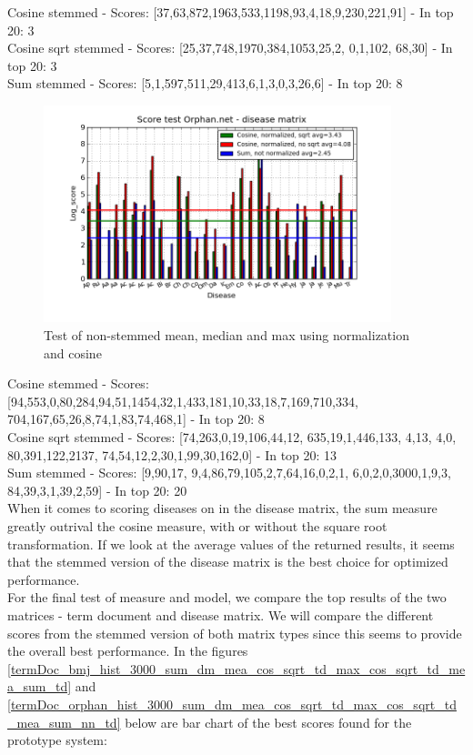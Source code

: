 {\small 
Cosine stemmed - Scores: [37,63,872,1963,533,1198,93,4,18,9,230,221,91] - In top 20: 3 \\
Cosine sqrt stemmed - Scores: [25,37,748,1970,384,1053,25,2, 0,1,102, 68,30] - In top 20: 3 \\
Sum stemmed - Scores: [5,1,597,511,29,413,6,1,3,0,3,26,6] - In top 20: 8
}
\begin{figure}[h!]
        \begin{center}
          \includegraphics[width=0.9\textwidth]{barcharts/diseaseMatrix_orphan_hist_NOTnorm_3000_s_cos_sqrt_cos_sum_nn.png}
        \end{center}
        \caption{Test of non-stemmed mean, median and max using normalization and cosine}
        \label{diseaseMatrix_orphan_hist_NOTnorm_3000_s_cos_sqrt_cos_sum_nn}
\end{figure}

{\small
Cosine stemmed - Scores: [94,553,0,80,284,94,51,1454,32,1,433,181,10,33,18,7,169,710,334, 704,167,65,26,8,74,1,83,74,468,1] - In top 20: 8 \\
Cosine sqrt stemmed - Scores: [74,263,0,19,106,44,12, 635,19,1,446,133, 4,13, 4,0, 80,391,122,2137, 74,54,12,2,30,1,99,30,162,0] - In top 20: 13 \\
Sum stemmed - Scores: [9,90,17, 9,4,86,79,105,2,7,64,16,0,2,1, 6,0,2,0,3000,1,9,3, 84,39,3,1,39,2,59] - In top 20: 20 \\
}
When it comes to scoring diseases on in the disease matrix, the sum measure greatly outrival the cosine measure, with or without the square root transformation. If we look at the average values of the returned results, it seems that the stemmed version of the disease matrix is the best choice for optimized performance. \\

For the final test of measure and model, we compare the top results of the two matrices - term document and disease matrix. We will compare the different scores from the stemmed version of both matrix types since this seems to provide the overall best performance. In the figures \ref{termDoc_bmj_hist_3000_sum_dm_mea_cos_sqrt_td_max_cos_sqrt_td_mea_sum_td} and \ref{termDoc_orphan_hist_3000_sum_dm_mea_cos_sqrt_td_max_cos_sqrt_td_mea_sum_nn_td} below are bar chart of the best scores found for the prototype system:

